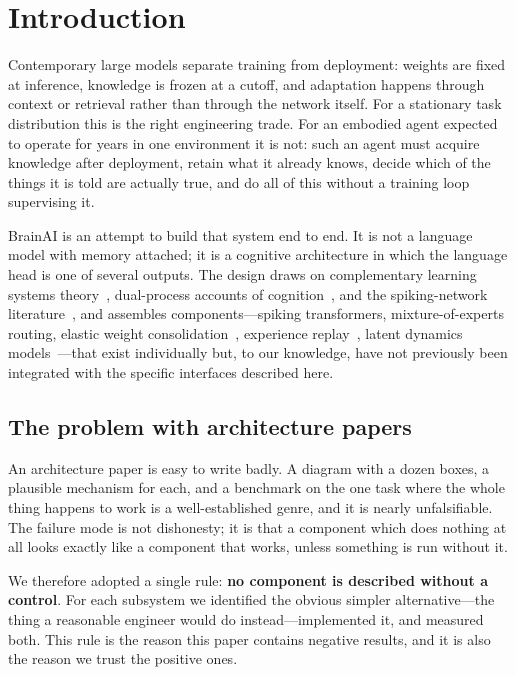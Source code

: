 \documentclass[10pt,twocolumn]{article}
\begin{document}
\section{Introduction}

Contemporary large models separate training from deployment: weights are fixed
at inference, knowledge is frozen at a cutoff, and adaptation happens through
context or retrieval rather than through the network itself. For a stationary
task distribution this is the right engineering trade. For an embodied agent
expected to operate for years in one environment it is not: such an agent must
acquire knowledge after deployment, retain what it already knows, decide which
of the things it is told are actually true, and do all of this without a
training loop supervising it.

BrainAI is an attempt to build that system end to end. It is not a language
model with memory attached; it is a cognitive architecture in which the
language head is one of several outputs. The design draws on complementary
learning systems theory~\cite{mcclelland1995}, dual-process
accounts of cognition~\cite{kahneman2011}, and the spiking-network
literature~\cite{maass1997,neftci2019}, and assembles components---spiking
transformers, mixture-of-experts routing, elastic weight
consolidation~\cite{kirkpatrick2017}, experience replay~\cite{rolnick2019},
latent dynamics models~\cite{hafner2019}---that exist individually but, to our
knowledge, have not previously been integrated with the specific interfaces
described here.

\subsection{The problem with architecture papers}

An architecture paper is easy to write badly. A diagram with a dozen boxes, a
plausible mechanism for each, and a benchmark on the one task where the whole
thing happens to work is a well-established genre, and it is nearly
unfalsifiable. The failure mode is not dishonesty; it is that a component which
does nothing at all looks exactly like a component that works, unless something
is run without it.

We therefore adopted a single rule: \textbf{no component is described without a
control}. For each subsystem we identified the obvious simpler alternative---the
thing a reasonable engineer would do instead---implemented it, and measured
both. This rule is the reason this paper contains negative results, and it is
also the reason we trust the positive ones.
\end{document}
